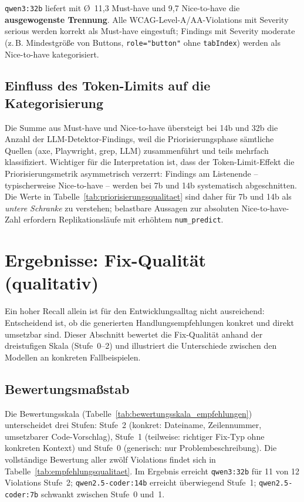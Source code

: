\texttt{qwen3:32b} liefert mit \O{}~11,3 Must-have und 9,7 Nice-to-have die \textbf{ausgewogenste Trennung}. Alle \ac{WCAG}-Level-A/AA-Violations mit Severity serious werden korrekt als Must-have eingestuft; Findings mit Severity moderate (z.\,B. Mindestgröße von Buttons, \texttt{role="button"} ohne \texttt{tabIndex}) werden als Nice-to-have kategorisiert.

\subsection{Einfluss des Token-Limits auf die Kategorisierung}
\label{sec:prio_tokenlimit}

Die Summe aus Must-have und Nice-to-have übersteigt bei 14b und 32b die Anzahl der \ac{LLM}-Detektor-Findings, weil die Priorisierungsphase sämtliche Quellen (axe, Playwright, grep, \ac{LLM}) zusammenführt und teils mehrfach klassifiziert. Wichtiger für die Interpretation ist, dass der Token-Limit-Effekt die Priorisierungsmetrik asymmetrisch verzerrt: Findings am Listenende -- typischerweise Nice-to-have -- werden bei 7b und 14b systematisch abgeschnitten. Die Werte in Tabelle~\ref{tab:priorisierungsqualitaet} sind daher für 7b und 14b als \textit{untere Schranke} zu verstehen; belastbare Aussagen zur absoluten Nice-to-have-Zahl erfordern Replikationsläufe mit erhöhtem \texttt{num\_predict}.

\section{Ergebnisse: Fix-Qualität (qualitativ)}
\label{sec:ergebnisse_qualitaet}

Ein hoher Recall allein ist für den Entwicklungsalltag nicht ausreichend: Entscheidend ist, ob die generierten Handlungsempfehlungen konkret und direkt umsetzbar sind. Dieser Abschnitt bewertet die Fix-Qualität anhand der dreistufigen Skala (Stufe~0--2) und illustriert die Unterschiede zwischen den Modellen an konkreten Fallbeispielen.

\subsection{Bewertungsmaßstab}
\label{sec:fix_skala}

Die Bewertungsskala (Tabelle~\ref{tab:bewertungsskala_empfehlungen}) unterscheidet drei Stufen: Stufe~2 (konkret: Dateiname, Zeilennummer, umsetzbarer Code-Vorschlag), Stufe~1 (teilweise: richtiger Fix-Typ ohne konkreten Kontext) und Stufe~0 (generisch: nur Problembeschreibung). Die vollständige Bewertung aller zwölf Violations findet sich in Tabelle~\ref{tab:empfehlungsqualitaet}. Im Ergebnis erreicht \texttt{qwen3:32b} für 11 von 12 Violations Stufe~2; \texttt{qwen2.5-coder:14b} erreicht überwiegend Stufe~1; \texttt{qwen2.5-coder:7b} schwankt zwischen Stufe~0 und~1.


